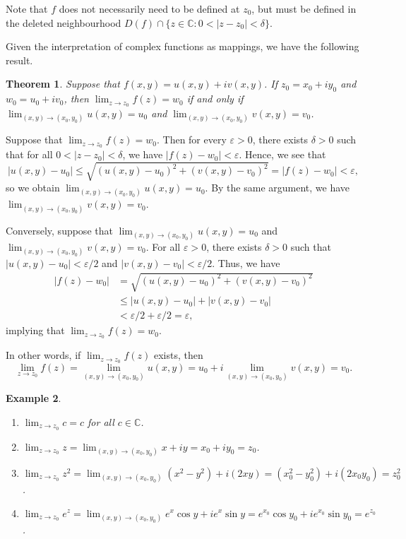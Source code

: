 \documentclass[10pt]{article}
\makeatletter
\newcommand{\eps}{\varepsilon}
\newcommand{\C}{\mathbb{C}}
\theoremstyle{newstyle}
\newtheorem{thm}{Theorem}[section]
\newtheorem{exmp}[thm]{Example}
\newenvironment{pf}[1][\proofname]{\par
  \pushQED{\qed}%
  \normalfont \topsep0\p@\relax
  \trivlist
  \item[\hskip\labelsep\scshape
  #1\@addpunct{.}]\ignorespaces
}{%
  \popQED\endtrivlist\@endpefalse
}
\makeatother
\begin{document}
Note that $f$ does not necessarily need to be defined at $z_0$, but must be defined in the deleted neighbourhood 
$D(f) \cap \{z \in \C : 0 < |z-z_0| < \delta\}$. 

Given the interpretation of complex functions as mappings, we have the following result. 

\begin{thm}
Suppose that $f(x, y) = u(x, y) + iv(x, y)$. If $z_0 = x_0 + iy_0$ and $w_0 = u_0 + iv_0$, then 
$\lim_{z\to z_0} f(z) = w_0$ if and only if $\lim_{(x,y)\to(x_0, y_0)} u(x, y) = u_0$ and 
$\lim_{(x,y)\to(x_0,y_0)} v(x, y) = v_0$. 
\end{thm}
\begin{pf}
Suppose that $\lim_{z\to z_0} f(z) = w_0$. Then for every $\eps > 0$, there exists $\delta > 0$ 
such that for all $0 < |z - z_0| < \delta$, we have $|f(z) - w_0| < \eps$. Hence, we see that 
\[ |u(x, y) - u_0| \leq \sqrt{(u(x, y) - u_0)^2 + (v(x, y) - v_0)^2} = |f(z) - w_0| < \eps, \]
so we obtain $\lim_{(x,y)\to(x_0,y_0)} u(x, y) = u_0$. By the same argument, 
we have $\lim_{(x,y)\to(x_0,y_0)} v(x, y) = v_0$.

Conversely, suppose that $\lim_{(x,y)\to(x_0, y_0)} u(x, y) = u_0$ and 
$\lim_{(x,y)\to(x_0,y_0)} v(x, y) = v_0$. For all $\eps > 0$, there exists 
$\delta > 0$ such that $|u(x, y) - u_0| < \eps/2$ and $|v(x, y) - v_0| < \eps/2$. 
Thus, we have 
\begin{align*}
    |f(z) - w_0| &= \sqrt{(u(x, y) - u_0)^2 + (v(x, y) - v_0)^2} \\
    &\leq |u(x, y) - u_0| + |v(x, y) - v_0| \\
    &< \eps/2 + \eps/2 = \eps,
\end{align*}
implying that $\lim_{z\to z_0} f(z) = w_0$.
\end{pf}

In other words, if $\lim_{z\to z_0} f(z)$ exists, then 
\[ \lim_{z\to z_0} f(z) = \lim_{(x,y)\to(x_0,y_0)} u(x, y) = u_0 + i 
\lim_{(x,y)\to(x_0,y_0)} v(x, y) = v_0. \]

\begin{exmp}~
\begin{enumerate}[(1)]
    \item $\lim_{z\to z_0} c = c$ for all $c \in \C$.
    \item $\lim_{z\to z_0} z = \lim_{(x,y)\to(x_0,y_0)} x + iy = x_0 + iy_0 = z_0$.
    \item $\lim_{z\to z_0} z^2 = \lim_{(x,y)\to(x_0,y_0)} (x^2 - y^2) + i(2xy) = 
    (x_0^2 - y_0^2) + i(2x_0y_0) = z_0^2$.
    \item $\lim_{z\to z_0} e^z = \lim_{(x,y)\to(x_0,y_0)} e^x\cos y + ie^x\sin y = e^{x_0}\cos y_0
    + ie^{x_0} \sin y_0 = e^{z_0}$.
\end{enumerate}
\end{exmp}
\end{document}
